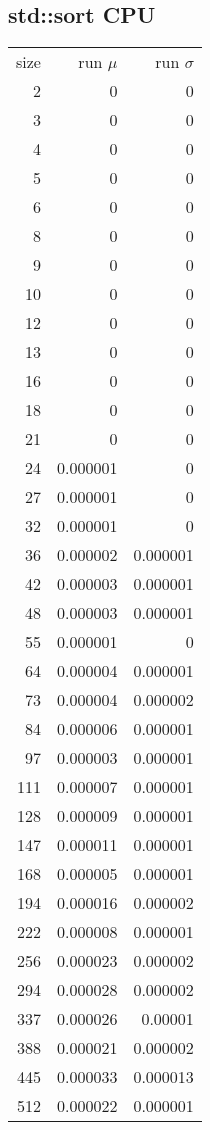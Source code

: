 \subsection*{std::sort CPU}

\begin{longtable}{r r r}
size & run $\mu$ & run $\sigma$ \\
2 & 0 & 0 \\
3 & 0 & 0 \\
4 & 0 & 0 \\
5 & 0 & 0 \\
6 & 0 & 0 \\
8 & 0 & 0 \\
9 & 0 & 0 \\
10 & 0 & 0 \\
12 & 0 & 0 \\
13 & 0 & 0 \\
16 & 0 & 0 \\
18 & 0 & 0 \\
21 & 0 & 0 \\
24 & 0.000001 & 0 \\
27 & 0.000001 & 0 \\
32 & 0.000001 & 0 \\
36 & 0.000002 & 0.000001 \\
42 & 0.000003 & 0.000001 \\
48 & 0.000003 & 0.000001 \\
55 & 0.000001 & 0 \\
64 & 0.000004 & 0.000001 \\
73 & 0.000004 & 0.000002 \\
84 & 0.000006 & 0.000001 \\
97 & 0.000003 & 0.000001 \\
111 & 0.000007 & 0.000001 \\
128 & 0.000009 & 0.000001 \\
147 & 0.000011 & 0.000001 \\
168 & 0.000005 & 0.000001 \\
194 & 0.000016 & 0.000002 \\
222 & 0.000008 & 0.000001 \\
256 & 0.000023 & 0.000002 \\
294 & 0.000028 & 0.000002 \\
337 & 0.000026 & 0.00001 \\
388 & 0.000021 & 0.000002 \\
445 & 0.000033 & 0.000013 \\
512 & 0.000022 & 0.000001 \\

\end{longtable}
